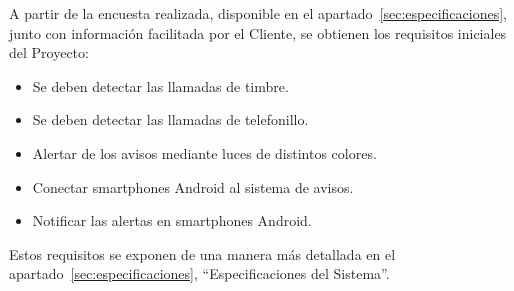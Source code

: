     \label{chap:requisitosiniciales}

A partir de la encuesta realizada, disponible en el apartado~\ref{sec:especificaciones}, junto con información facilitada por el Cliente, se obtienen los requisitos iniciales del Proyecto:
    \begin{itemize}
        \item Se deben detectar las llamadas de timbre.
        \item Se deben detectar las llamadas de telefonillo.
        \item Alertar de los avisos mediante luces de distintos colores.
        \item Conectar smartphones Android al sistema de avisos.
        \item Notificar las alertas en smartphones Android.
    \end{itemize}

Estos requisitos se exponen de una manera más detallada en el apartado~\ref{sec:especificaciones}, ``Especificaciones del Sistema''.
